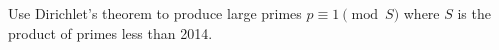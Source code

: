 Use Dirichlet’s theorem to produce large primes $p \equiv 1 \pmod{S}$ where $S$ is the product of primes less than 2014. 
